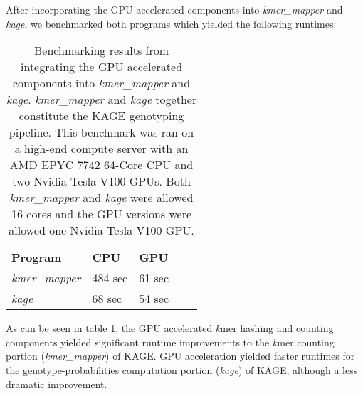 After incorporating the GPU accelerated components into \textit{kmer\_mapper} and \textit{kage}, we benchmarked both programs which yielded the following runtimes:
\begin{table}[H]
\begin{center}
\begin{tabular}{lllll}
  \multicolumn{1}{l|}{\textbf{Program}} & \multicolumn{1}{l}{\textbf{CPU}} & \multicolumn{1}{l}{\textbf{GPU}} & \\ \cline{1-3}
  \multicolumn{1}{l|}{\textit{kmer\_mapper}} & \multicolumn{1}{l}{484 sec} & \multicolumn{1}{l}{61 sec} & \\
  \multicolumn{1}{l|}{\textit{kage}} & \multicolumn{1}{l}{68 sec} & \multicolumn{1}{l}{54 sec} & \\
\end{tabular}
\end{center}
\caption{
  Benchmarking results from integrating the GPU accelerated components into \textit{kmer\_mapper} and \textit{kage}.
  \textit{kmer\_mapper} and \textit{kage} together constitute the KAGE genotyping pipeline.
  This benchmark was ran on a high-end compute server with an AMD EPYC 7742 64-Core CPU and two Nvidia Tesla V100 GPUs.
  Both \textit{kmer\_mapper} and \textit{kage} were allowed 16 cores and the GPU versions were allowed one Nvidia Tesla V100 GPU.
}
\label{methods:integration_into_kage:tables:benchmark}
\end{table}

As can be seen in table \ref{methods:integration_into_kage:tables:benchmark}, the GPU accelerated \textit{k}mer hashing and counting components yielded significant runtime improvements to the \textit{k}mer counting portion (\textit{kmer\_mapper}) of KAGE.
GPU acceleration yielded faster runtimes for the genotype-probabilities computation portion (\textit{kage}) of KAGE, although a less dramatic improvement.
